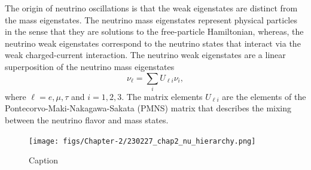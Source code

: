 The origin of neutrino oscillations is that the weak eigenstates are distinct from the mass eigenstates. The neutrino mass eigenstates represent physical particles in the sense that they are solutions to the free-particle Hamiltonian, whereas, the neutrino weak eigenstates correspond to the neutrino states that interact via the weak charged-current interaction. The neutrino weak eigenstates are a linear superposition of the neutrino mass eigenstates
\begin{equation}
    \nu_\ell=\sum_i{U_{\ell i}\nu_i},
\end{equation}
where $\ell=e,\mu,\tau$ and $i=1,2,3$. The matrix elements $U_{\ell i}$ are the elements of the Pontecorvo-Maki-Nakagawa-Sakata (PMNS) matrix that describes the mixing between the neutrino flavor and mass states.

\begin{figure}[htbp]
    \centering
    \texttt{[image: figs/Chapter-2/230227\_chap2\_nu\_hierarchy.png]}
    \caption{Caption}
    \label{fig:chap2-nu-hierarchy}
\end{figure}

